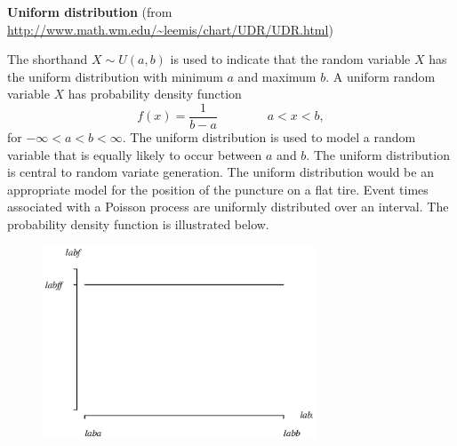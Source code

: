 \documentclass[12pt,fullpage]{article}
\begin{document}
\noindent
{\bf Uniform distribution} (from \color{blue}\url{http://www.math.wm.edu/~leemis/chart/UDR/UDR.html}\color{black})

\noindent
The shorthand $X \sim U(a,b)$ is used to indicate that the
random variable $X$ has the uniform distribution with minimum $a$ and maximum $b$.
A uniform random variable $X$ has probability density function 
$$
f(x) = \frac{1}{b-a} \qquad \qquad a < x < b,
$$
for $-\infty < a < b < \infty$.
The uniform distribution is used to model a random variable that is equally
likely to occur between $a$ and $b$.
The uniform distribution is central to random variate generation.
The uniform distribution would be an appropriate model for the position of the puncture on a flat tire.
Event times associated with a Poisson process are uniformly distributed over an interval.
The probability density function is illustrated below.
{\begin{figure}[h!]
\begin{center}
\includegraphics[width=3.2in]{UniformPlot.ps}
\end{center}
\end{figure}}
\end{document}

